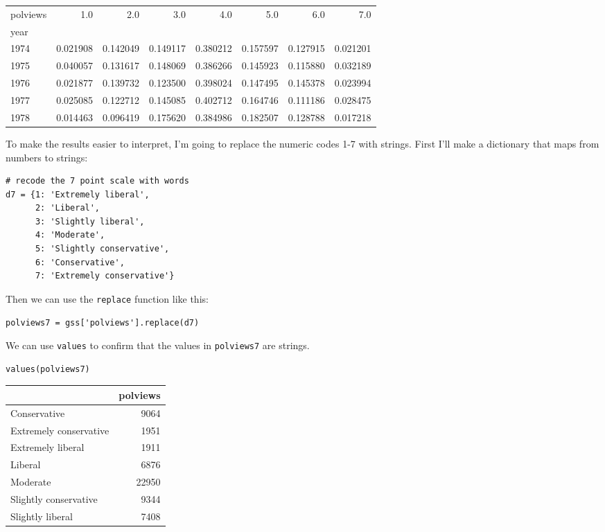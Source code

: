 \begin{tabular}{lrrrrrrr}
\midrule
polviews &       1.0 &       2.0 &       3.0 &       4.0 &       5.0 &       6.0 &       7.0 \\
year &           &           &           &           &           &           &           \\
\midrule
1974 &  0.021908 &  0.142049 &  0.149117 &  0.380212 &  0.157597 &  0.127915 &  0.021201 \\
1975 &  0.040057 &  0.131617 &  0.148069 &  0.386266 &  0.145923 &  0.115880 &  0.032189 \\
1976 &  0.021877 &  0.139732 &  0.123500 &  0.398024 &  0.147495 &  0.145378 &  0.023994 \\
1977 &  0.025085 &  0.122712 &  0.145085 &  0.402712 &  0.164746 &  0.111186 &  0.028475 \\
1978 &  0.014463 &  0.096419 &  0.175620 &  0.384986 &  0.182507 &  0.128788 &  0.017218 \\
\midrule
\end{tabular}

To make the results easier to interpret, I'm going to replace the
numeric codes 1-7 with strings. First I'll make a dictionary that maps
from numbers to strings:

\begin{lstlisting}[]
# recode the 7 point scale with words
d7 = {1: 'Extremely liberal', 
      2: 'Liberal', 
      3: 'Slightly liberal', 
      4: 'Moderate', 
      5: 'Slightly conservative', 
      6: 'Conservative', 
      7: 'Extremely conservative'}
\end{lstlisting}

Then we can use the \passthrough{\lstinline!replace!} function like
this:

\begin{lstlisting}[]
polviews7 = gss['polviews'].replace(d7)
\end{lstlisting}

We can use \passthrough{\lstinline!values!} to confirm that the values
in \passthrough{\lstinline!polviews7!} are strings.

\begin{lstlisting}[]
values(polviews7)
\end{lstlisting}

\begin{tabular}{lr}
\midrule
{} &  polviews \\
\midrule
Conservative           &      9064 \\
Extremely conservative &      1951 \\
Extremely liberal      &      1911 \\
Liberal                &      6876 \\
Moderate               &     22950 \\
Slightly conservative  &      9344 \\
Slightly liberal       &      7408 \\
\midrule
\end{tabular}

